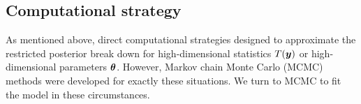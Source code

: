 \documentclass[12pt]{article}
\def\bth{\mbox{\boldmath $\theta$}}
\newcommand{\by}{\mbox{\boldmath $y$}}
\begin{document}



\subsection{Computational strategy}
\label{highDim}

As mentioned above, direct computational strategies designed to approximate the restricted posterior break down for high-dimensional statistics $T(\by)$ or high-dimensional parameters $\bth$. %
However, Markov chain Monte Carlo (MCMC) methods were developed for exactly these situations.  We turn to MCMC to 
fit the model in these circumstances.  
\end{document}
